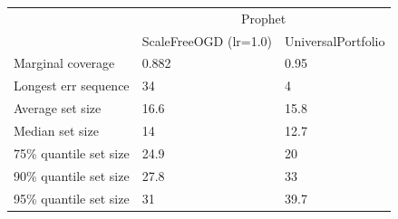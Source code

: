 \begin{tabular}{lll}
\toprule
& \multicolumn{2}{c}{Prophet} \\
& ScaleFreeOGD (lr=1.0) & UniversalPortfolio \\
\midrule
Marginal coverage & 0.882 & 0.95 \\
Longest err sequence & 34 & 4 \\
Average set size & 16.6 & 15.8 \\
Median set size & 14 & 12.7 \\
75\% quantile set size & 24.9 & 20 \\
90\% quantile set size & 27.8 & 33 \\
95\% quantile set size & 31 & 39.7 \\
\bottomrule
\end{tabular}

